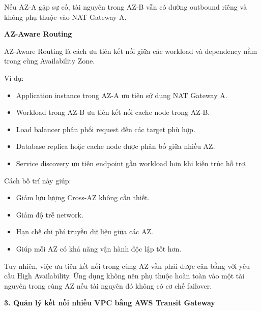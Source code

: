 \begin{Shaded}
\begin{Highlighting}[]
\end{Highlighting}
\end{Shaded}

Nếu AZ-A gặp sự cố, tài nguyên trong AZ-B vẫn có đường outbound riêng và
không phụ thuộc vào NAT Gateway A.

\vspace{0.5em}\noindent\textbf{AZ-Aware Routing}\par

AZ-Aware Routing là cách ưu tiên kết nối giữa các workload và dependency
nằm trong cùng Availability Zone.

Ví dụ:

\begin{itemize}
\tightlist
\item
  Application instance trong AZ-A ưu tiên sử dụng NAT Gateway A.
\item
  Workload trong AZ-B ưu tiên kết nối cache node trong AZ-B.
\item
  Load balancer phân phối request đến các target phù hợp.
\item
  Database replica hoặc cache node được phân bố giữa nhiều AZ.
\item
  Service discovery ưu tiên endpoint gần workload hơn khi kiến trúc hỗ
  trợ.
\end{itemize}

Cách bố trí này giúp:

\begin{itemize}
\tightlist
\item
  Giảm lưu lượng Cross-AZ không cần thiết.
\item
  Giảm độ trễ network.
\item
  Hạn chế chi phí truyền dữ liệu giữa các AZ.
\item
  Giúp mỗi AZ có khả năng vận hành độc lập tốt hơn.
\end{itemize}

Tuy nhiên, việc ưu tiên kết nối trong cùng AZ vẫn phải được cân bằng với
yêu cầu High Availability. Ứng dụng không nên phụ thuộc hoàn toàn vào
một tài nguyên trong cùng AZ nếu tài nguyên đó không có cơ chế failover.

\vspace{0.5em}\noindent\textbf{3. Quản lý kết nối nhiều VPC bằng AWS Transit
Gateway}\par

